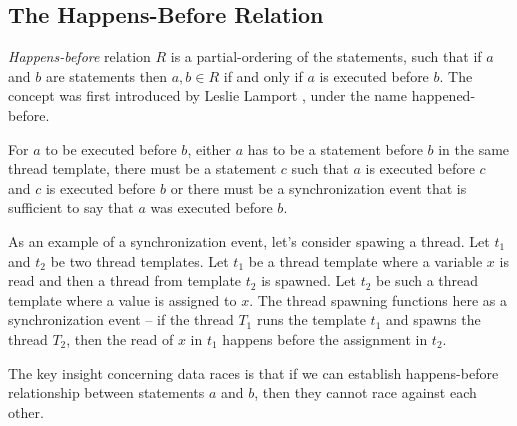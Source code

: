 \documentclass[..thesis.tex]{subfiles}
\begin{document}
\subsection{The Happens-Before Relation}

\textit{Happens-before} relation $R$ is a partial-ordering of the statements, such that if $a$ and $b$ are statements then $a,b \in R$ if and only if $a$ is executed before $b$.
The concept was first introduced by Leslie Lamport \cite{lamport_time_1978}, under the name happened-before.

For $a$ to be executed before $b$, either $a$ has to be a statement before $b$ in the same thread template,
there must be a statement $c$ such that $a$ is executed before $c$ and $c$ is executed before $b$ or
there must be a synchronization event that is sufficient to say that $a$ was executed before $b$.

As an example of a synchronization event, let's consider spawing a thread. Let $t_1$ and $t_2$ be two thread templates.
Let $t_1$ be a thread template where a variable $x$ is read and then a thread from template $t_2$ is spawned.
Let $t_2$ be such a thread template where a value is assigned to $x$. The thread spawning functions here as a synchronization event -- 
if the thread $T_1$ runs the template $t_1$ and spawns the thread $T_2$, then the read of $x$ in $t_1$ happens before the assignment in $t_2$.

The key insight concerning data races is that if we can establish happens-before relationship between statements $a$ and $b$, then they cannot race against each other. 
\end{document}
